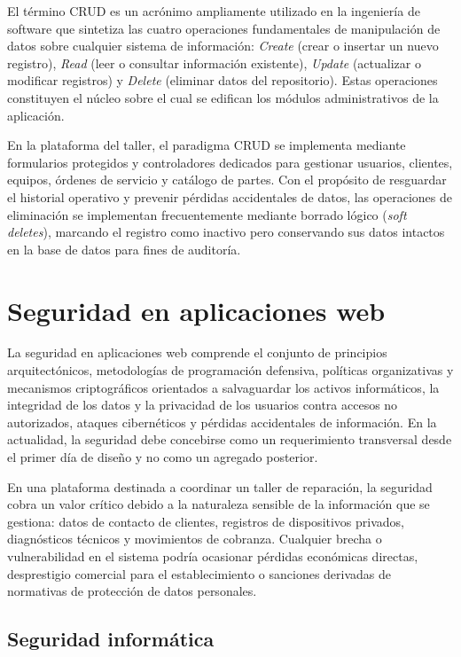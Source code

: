 El término CRUD es un acrónimo ampliamente utilizado en la ingeniería de software que sintetiza las cuatro operaciones fundamentales de manipulación de datos sobre cualquier sistema de información: \textit{Create} (crear o insertar un nuevo registro), \textit{Read} (leer o consultar información existente), \textit{Update} (actualizar o modificar registros) y \textit{Delete} (eliminar datos del repositorio). Estas operaciones constituyen el núcleo sobre el cual se edifican los módulos administrativos de la aplicación.

En la plataforma del taller, el paradigma CRUD se implementa mediante formularios protegidos y controladores dedicados para gestionar usuarios, clientes, equipos, órdenes de servicio y catálogo de partes. Con el propósito de resguardar el historial operativo y prevenir pérdidas accidentales de datos, las operaciones de eliminación se implementan frecuentemente mediante borrado lógico (\textit{soft deletes}), marcando el registro como inactivo pero conservando sus datos intactos en la base de datos para fines de auditoría.

\section{Seguridad en aplicaciones web}

La seguridad en aplicaciones web comprende el conjunto de principios arquitectónicos, metodologías de programación defensiva, políticas organizativas y mecanismos criptográficos orientados a salvaguardar los activos informáticos, la integridad de los datos y la privacidad de los usuarios contra accesos no autorizados, ataques cibernéticos y pérdidas accidentales de información. En la actualidad, la seguridad debe concebirse como un requerimiento transversal desde el primer día de diseño y no como un agregado posterior.

En una plataforma destinada a coordinar un taller de reparación, la seguridad cobra un valor crítico debido a la naturaleza sensible de la información que se gestiona: datos de contacto de clientes, registros de dispositivos privados, diagnósticos técnicos y movimientos de cobranza. Cualquier brecha o vulnerabilidad en el sistema podría ocasionar pérdidas económicas directas, desprestigio comercial para el establecimiento o sanciones derivadas de normativas de protección de datos personales.

\subsection{Seguridad informática}

